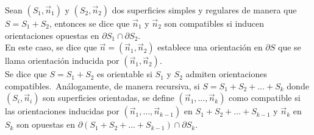\begin{definición} 
Sean \( (S_1, \vec{n}_1) \) y \( (S_2, \vec{n}_2) \) dos superficies simples y regulares de manera que \( S = S_1 + S_2 \), entonces se dice que $\vec{n}_1$ y $\vec{n}_2$ son compatibles si inducen orientaciones opuestas en $\partial S_1 \cap \partial S_2$.\\
En este caso, se dice que $\vec{n} = (\vec{n}_1, \vec{n}_2)$ establece una orientación en $\partial S$ que se llama orientación inducida por $(\vec{n}_1, \vec{n}_2)$.\\
Se dice que $S = S_1 + S_2$ es orientable si $S_1$ y $S_2$ admiten orientaciones compatibles.\
Análogamente, de manera recursiva, si $S = S_1 + S_2 + \ldots + S_k$ donde $(S_i, \vec{n}_i)$ son superficies orientadas, se define $(\vec{n}_1, \ldots, \vec{n}_k)$ como compatible si las orientaciones inducidas por $(\vec{n}_1, \ldots, \vec{n}_{k-1})$ en $S_1 + S_2 + \ldots + S_{k-1}$ y $\vec{n}_k$ en $S_k$ son opuestas en $\partial (S_1 + S_2 + \ldots + S_{k-1}) \cap \partial S_k$.
\end{definición}

